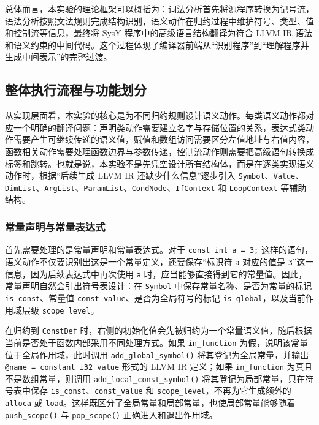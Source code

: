 \documentclass[12pt]{ctexart}
\begin{document}
总体而言，本实验的理论框架可以概括为：词法分析首先将源程序转换为记号流，语法分析按照文法规则完成结构识别，语义动作在归约过程中维护符号、类型、值和控制流等信息，最终将 SysY 程序中的高级语言结构翻译为符合 LLVM IR 语法和语义约束的中间代码。这个过程体现了编译器前端从“识别程序”到“理解程序并生成中间表示”的完整过渡。

\subsection{整体执行流程与功能划分}

从实现层面看，本实验的核心是为不同归约规则设计语义动作。每类语义动作都对应一个明确的翻译问题：声明类动作需要建立名字与存储位置的关系，表达式类动作需要产生可继续传递的语义值，赋值和数组访问需要区分左值地址与右值内容，函数相关动作需要处理函数边界与参数传递，控制流动作则需要把高级语句转换成标签和跳转。也就是说，本实验不是先凭空设计所有结构体，而是在逐类实现语义动作时，根据“后续生成 LLVM IR 还缺少什么信息”逐步引入 \texttt{Symbol}、\texttt{Value}、\texttt{DimList}、\texttt{ArgList}、\texttt{ParamList}、\texttt{CondNode}、\texttt{IfContext} 和 \texttt{LoopContext} 等辅助结构。

\subsubsection{常量声明与常量表达式}

首先需要处理的是常量声明和常量表达式。对于 \texttt{const int a = 3;} 这样的语句，语义动作不仅要识别出这是一个常量定义，还要保存“标识符 \texttt{a} 对应的值是 \texttt{3}”这一信息，因为后续表达式中再次使用 \texttt{a} 时，应当能够直接得到它的常量值。因此，常量声明自然会引出符号表设计：在 \texttt{Symbol} 中保存常量名称、是否为常量的标记 \texttt{is\_const}、常量值 \texttt{const\_value}、是否为全局符号的标记 \texttt{is\_global}，以及当前作用域层级 \texttt{scope\_level}。

在归约到 \texttt{ConstDef} 时，右侧的初始化值会先被归约为一个常量语义值，随后根据当前是否处于函数内部采用不同处理方式。如果 \texttt{in\_function} 为假，说明该常量位于全局作用域，此时调用 \texttt{add\_global\_symbol()} 将其登记为全局常量，并输出 \texttt{@name = constant i32 value} 形式的 LLVM IR 定义；如果 \texttt{in\_function} 为真且不是数组常量，则调用 \texttt{add\_local\_const\_symbol()} 将其登记为局部常量，只在符号表中保存 \texttt{is\_const}、\texttt{const\_value} 和 \texttt{scope\_level}，不再为它生成额外的 \texttt{alloca} 或 \texttt{load}。这样既区分了全局常量和局部常量，也使局部常量能够随着 \texttt{push\_scope()} 与 \texttt{pop\_scope()} 正确进入和退出作用域。
\end{document}
